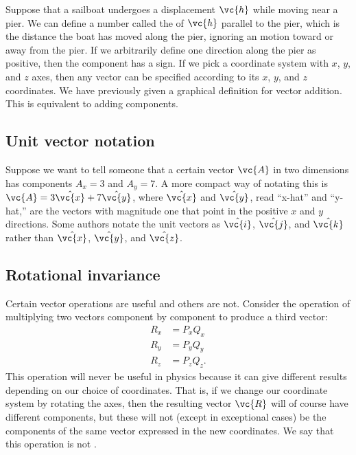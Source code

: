 Suppose that a sailboat undergoes a displacement $\vc{h}$ while moving near
a pier.
We can define a number called the  of $\vc{h}$ parallel to
the pier, which is the distance the boat has moved along the pier, ignoring
an motion toward or away from the pier. If we arbitrarily define one direction
along the pier as positive, then the component has a sign. If we pick a coordinate system
with $x$, $y$, and $z$ axes, then any vector can be specified according to its
$x$, $y$, and $z$ coordinates. We have previously given a graphical definition for
vector addition. This is equivalent to adding components.

\subsection{Unit vector notation}
Suppose we want to tell someone that a certain vector $\vc{A}$ in two dimensions
has components $A_x=3$ and $A_y=7$. A more compact way of notating this is
$\vc{A}=3\hat{\vc{x}}+7\hat{\vc{y}}$, where $\hat{\vc{x}}$ and $\hat{\vc{y}}$, read ``x-hat'' and ``y-hat,''
are the vectors with magnitude one that point in the positive $x$ and $y$
directions. Some authors notate the unit vectors as $\hat{\vc{i}}$, $\hat{\vc{j}}$, and $\hat{\vc{k}}$
rather than $\hat{\vc{x}}$, $\hat{\vc{y}}$, and $\hat{\vc{z}}$.

\subsection{Rotational invariance}

Certain vector operations
are useful and others are not. Consider the operation of
multiplying two vectors component by component to produce a third vector:
\begin{align*}
        R_x    &=    P_x Q_x  \\
        R_y    &=    P_y Q_y  \\
        R_z    &=    P_z Q_z.
\end{align*}
This operation will never be useful in physics because it can give different
results depending on our choice of coordinates. That is, if we change our coordinate
system by rotating the axes, then the resulting vector
$\vc{R}$ will of course have different components, but these will not (except in exceptional cases)
be the components of the same vector expressed in the new coordinates. We say that this
operation is not .

